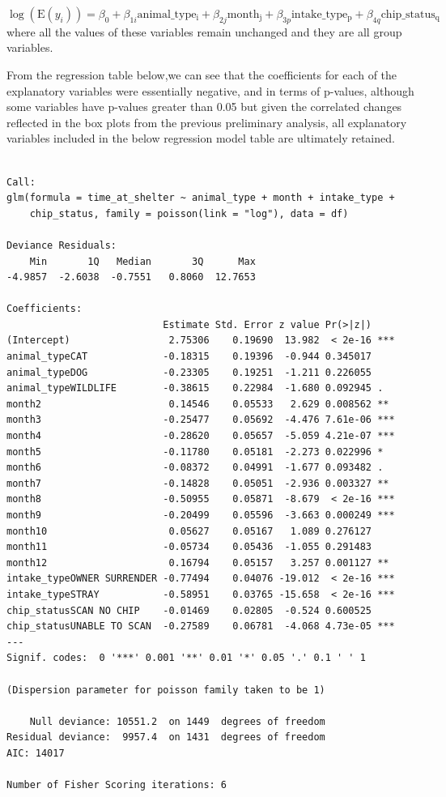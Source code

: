\documentclass[
]{article}
\begin{document}
\[
\log(\mathrm{E}(y_i)) = \beta_0 + \beta_{1i} \mathrm{animal\_type_i} + \beta_{2j} \mathrm{month_j} + \beta_{3p} \mathrm{intake\_type_p} + \beta_{4q} \mathrm{chip\_status_q}
\] where all the values of these variables remain unchanged and they are
all group variables.

From the regression table below,we can see that the coefficients for
each of the explanatory variables were essentially negative, and in
terms of p-values, although some variables have p-values greater than
0.05 but given the correlated changes reflected in the box plots from
the previous preliminary analysis, all explanatory variables included in
the below regression model table are ultimately retained.

\begin{verbatim}

Call:
glm(formula = time_at_shelter ~ animal_type + month + intake_type + 
    chip_status, family = poisson(link = "log"), data = df)

Deviance Residuals: 
    Min       1Q   Median       3Q      Max  
-4.9857  -2.6038  -0.7551   0.8060  12.7653  

Coefficients:
                           Estimate Std. Error z value Pr(>|z|)    
(Intercept)                 2.75306    0.19690  13.982  < 2e-16 ***
animal_typeCAT             -0.18315    0.19396  -0.944 0.345017    
animal_typeDOG             -0.23305    0.19251  -1.211 0.226055    
animal_typeWILDLIFE        -0.38615    0.22984  -1.680 0.092945 .  
month2                      0.14546    0.05533   2.629 0.008562 ** 
month3                     -0.25477    0.05692  -4.476 7.61e-06 ***
month4                     -0.28620    0.05657  -5.059 4.21e-07 ***
month5                     -0.11780    0.05181  -2.273 0.022996 *  
month6                     -0.08372    0.04991  -1.677 0.093482 .  
month7                     -0.14828    0.05051  -2.936 0.003327 ** 
month8                     -0.50955    0.05871  -8.679  < 2e-16 ***
month9                     -0.20499    0.05596  -3.663 0.000249 ***
month10                     0.05627    0.05167   1.089 0.276127    
month11                    -0.05734    0.05436  -1.055 0.291483    
month12                     0.16794    0.05157   3.257 0.001127 ** 
intake_typeOWNER SURRENDER -0.77494    0.04076 -19.012  < 2e-16 ***
intake_typeSTRAY           -0.58951    0.03765 -15.658  < 2e-16 ***
chip_statusSCAN NO CHIP    -0.01469    0.02805  -0.524 0.600525    
chip_statusUNABLE TO SCAN  -0.27589    0.06781  -4.068 4.73e-05 ***
---
Signif. codes:  0 '***' 0.001 '**' 0.01 '*' 0.05 '.' 0.1 ' ' 1

(Dispersion parameter for poisson family taken to be 1)

    Null deviance: 10551.2  on 1449  degrees of freedom
Residual deviance:  9957.4  on 1431  degrees of freedom
AIC: 14017

Number of Fisher Scoring iterations: 6
\end{verbatim}
\end{document}
